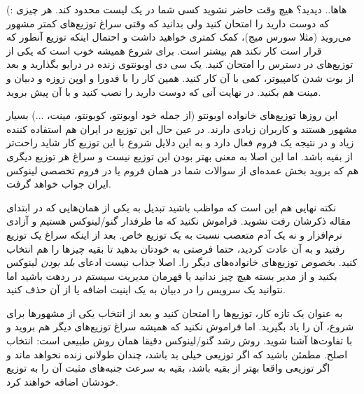 (: هاها.. دیدید؟ هیچ وقت حاضر نشوید کسی شما در یک لیست محدود کند. هر چیزی که دوست دارید را امتحان کنید ولی بدانید که وقتی سراغ توزیع‌های کمتر مشهور می‌روید (مثلا سورس میج)، کمک کمتری خواهید داشت و احتمال اینکه توزیع آنطور که قرار است کار نکند هم بیشتر است. برای شروع همیشه خوب است که یکی از توزیع‌های در دسترس را امتحان کنید. یک سی دی اوبونتوی زنده در درایو بگذارید و بعد از بوت شدن کامپیوتر، کمی با آن کار کنید. همین کار را با فدورا و اوپن زوزه و دبیان و مینت هم بکنید. در نهایت آنی که دوست دارید را نصب کنید و با آن پیش بروید.

این روزها توزیع‌های خانواده اوبونتو (از جمله خود اوبونتو، کوبونتو، مینت، ...) بسیار مشهور هستند و کاربران زیادی دارند. در عین حال این توزیع در ایران هم استفاده کننده زیاد و در نتیجه یک فروم فعال دارد و به این دلایل شروع با این توزیع کار شاید راحت‌تر از بقیه باشد. اما این اصلا به معنی بهتر بودن این توزیع نیست و سراغ هر توزیع دیگری هم که بروید بخش عمده‌ای از سوالات شما در همان فروم یا در فروم تخصصی لینوکس ایران جواب خواهد گرفت.

نکته نهایی هم این است که مواظب باشید تبدیل به یکی از همان‌هایی که در ابتدای مقاله ذکرشان رفت نشوید. فراموش نکنید که ما طرفدار گنو/لینوکس هستیم و آزادی نرم‌افزار و نه یک آدم متعصب نسبت به یک توزیع خاص. بعد از اینکه سراغ یک توزیع رفتید و به آن عادت کردید، حتما فرصتی به خودتان بدهید تا بقیه چیزها را هم انتخاب کنید. بخصوص توزیع‌های خانواده‌های دیگر را. اصلا جذاب نیست ادعای
\emph{بلد بودن}
لینوکس بکنید و از مدیر بسته 
 هیچ چیز ندانید یا قهرمان مدیریت سیستم در ردهت باشید اما نتوانید یک سرویس را در دبیان به یک اینیت اضافه یا از آن حذف کنید.

به عنوان یک تازه کار، توزیع‌ها را امتحان کنید و بعد از انتخاب یکی از مشهورها برای شروع،‌ آن را یاد بگیرید. اما فراموش نکنید که همیشه سراغ توزیع‌های دیگر هم بروید و با تفاوت‌ها آشنا شوید. روش رشد گنو/لینوکس دقیقا همان روش طبیعی است: انتخاب اصلح. مطمئن باشید که اگر توزیعی خیلی بد باشد، چندان طولانی زنده نخواهد ماند و اگر توزیعی واقعا بهتر از بقیه باشد، بقیه به سرعت جنبه‌های مثبت آن را به توزیع خودشان اضافه خواهند کرد.
